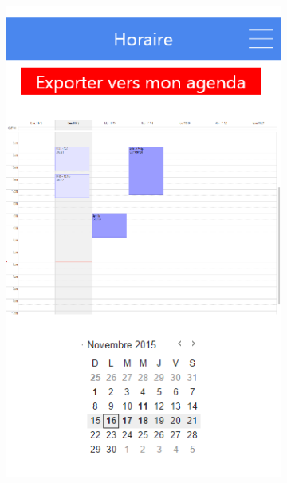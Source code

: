 \documentclass{eplmastersthesis}
\begin{document}
\begin{figure}[H]
\begin{subfigure}[b]{0.3\textwidth}
        \includegraphics[width=\textwidth]{Images/InVision/agenda.png}
    \end{subfigure}
\end{figure}
\end{document}
